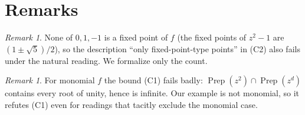 \documentclass[11pt]{article}
\theoremstyle{plain}
\theoremstyle{definition}
\theoremstyle{remark}
\newtheorem{remark}[theorem]{Remark}
\newcommand{\Prep}{\operatorname{Prep}}
\begin{document}
\fussy

\section{Remarks}

\begin{remark}
None of $0,1,-1$ is a fixed point of $f$ (the fixed points of $z^2-1$ are
$(1\pm\sqrt5)/2$), so the description ``only fixed-point-type points'' in (C2) also
fails under the natural reading. We formalize only the count.
\end{remark}

\begin{remark}
For monomial $f$ the bound (C1) fails badly: $\Prep(z^2)\cap\Prep(z^d)$ contains
every root of unity, hence is infinite. Our example is not monomial, so it refutes
(C1) even for readings that tacitly exclude the monomial case.
\end{remark}
\end{document}
